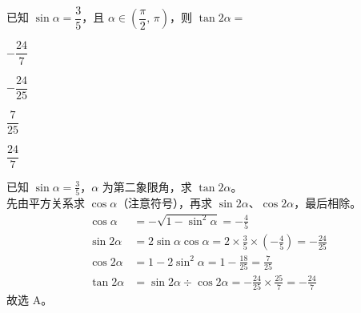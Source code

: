 \documentclass[12pt,a4paper,fontset=none]{exam-zh}
\begin{document}
\begin{question}
    已知 $\sin\alpha=\dfrac{3}{5}$，且 $\alpha\in\left(\dfrac{\pi}{2},\,\pi\right)$，则 $\tan2\alpha=$ \paren[A]
    \begin{choices}
        \item $-\dfrac{24}{7}$
        \item $-\dfrac{24}{25}$
        \item $\dfrac{7}{25}$
        \item $\dfrac{24}{7}$
    \end{choices}
\end{question}

\begin{solution}
    已知 $\sin\alpha=\frac{3}{5}$，$\alpha$ 为第二象限角，求 $\tan2\alpha$。 \\
    先由平方关系求 $\cos\alpha$（注意符号），再求 $\sin2\alpha$、$\cos2\alpha$，最后相除。 \\
    \begin{align*}
        \cos\alpha&=-\sqrt{1-\sin^2\alpha}=-\frac{4}{5} \\
        \sin2\alpha&=2\sin\alpha\cos\alpha=2\times\frac{3}{5}\times\left(-\frac{4}{5}\right)=-\frac{24}{25} \\
        \cos2\alpha&=1-2\sin^2\alpha=1-\frac{18}{25}=\frac{7}{25} \\
        \tan2\alpha&=\sin2\alpha\div\cos2\alpha=-\frac{24}{25}\times\frac{25}{7}=-\frac{24}{7}
    \end{align*}
    故选 A。
\end{solution}

\newpage
\end{document}
